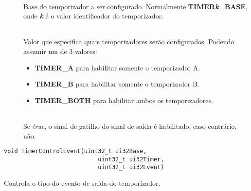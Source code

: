 \begin{description}
	\item []\hfill \\
	Base do temporizador a ser configurado. Normalmente \textbf{TIMER\emph{k}\_BASE}, onde \textbf{\emph{k}} é o valor identificador do temporizador.
	
	\item []\hfill \\
	Valor que especifica quais temporizadores serão configurados. Podendo assumir um de 3 valores:
	\begin{itemize}
		\item \textbf{TIMER\_A} para habilitar somente o temporizador A.
		\item \textbf{TIMER\_B} para habilitar somente o temporizador B.
		\item \textbf{TIMER\_BOTH} para habilitar ambos os temporizadores.
	\end{itemize}
	
	\item []\hfill \\
	Se \emph{true}, o sinal de gatilho do sinal de saída é habilitado, caso contrário, não.
\end{description}

\begin{lstlisting}[style=funcao]
	void TimerControlEvent(uint32_t ui32Base,
						   uint32_t ui32Timer,
						   uint32_t ui32Event)
\end{lstlisting}

Controla o tipo do evento de saída do temporizador.

